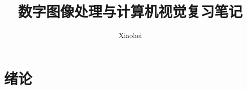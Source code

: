 \documentclass[cn, blue, normal, 12pt]{elegantnote}
\title{数字图像处理与计算机视觉复习笔记}
\author{Xiaohei}
\date{\zhtoday}
\begin{document}
\setlength{\lineskip}{0}
\setlength{\parskip}{0}

\maketitle

\section{绪论}
\end{document}
